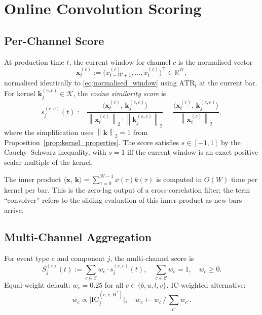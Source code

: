 \documentclass[11pt,a4paper]{article}
\theoremstyle{definition}
\theoremstyle{plain}
\newcommand{\R}{\mathbb{R}}
\newcommand{\bvec}[1]{\mathbf{#1}}
\newcommand{\norm}[1]{\left\lVert #1 \right\rVert}
\newcommand{\inner}[2]{\langle #1,\, #2 \rangle}
\begin{document}
\section{Online Convolution Scoring}
\label{sec:online}

\subsection{Per-Channel Score}

At production time $t$, the current window for channel $c$ is the normalised vector
\begin{equation}
    \bvec{x}^{(c)}_t :=
    \bigl(\tilde{x}^{(c)}_{t-W+1}, \ldots, \tilde{x}^{(c)}_t\bigr)^\top \in \R^W,
    \label{eq:live_window}
\end{equation}
normalised identically to \eqref{eq:normalised_window} using $\mathrm{ATR}_t$ at the
current bar. For kernel $\bvec{k}^{(e,c)}_j \in \mathcal{K}$, the \emph{cosine
similarity score} is
\begin{equation}
    s^{(e,c)}_j(t) :=
    \frac{\inner{\bvec{x}^{(c)}_t}{\bvec{k}^{(e,c)}_j}}
         {\norm{\bvec{x}^{(c)}_t}_2 \cdot \norm{\bvec{k}^{(e,c)}_j}_2}
    = \frac{\inner{\bvec{x}^{(c)}_t}{\bvec{k}^{(e,c)}_j}}
           {\norm{\bvec{x}^{(c)}_t}_2},
    \label{eq:cosine_score}
\end{equation}
where the simplification uses $\norm{\bvec{k}}_2 = 1$ from
Proposition~\ref{prop:kernel_properties}. The score satisfies $s \in [-1, 1]$ by the
Cauchy--Schwarz inequality, with $s = 1$ iff the current window is an exact positive
scalar multiple of the kernel.

The inner product $\inner{\bvec{x}}{\bvec{k}} = \sum_{\tau=0}^{W-1} x(\tau) k(\tau)$
is computed in $O(W)$ time per kernel per bar. This is the zero-lag output of a
cross-correlation filter; the term ``convolver'' refers to the sliding evaluation of this
inner product as new bars arrive.

\subsection{Multi-Channel Aggregation}

For event type $e$ and component $j$, the multi-channel score is
\begin{equation}
    S^{(e)}_j(t) :=
    \sum_{c \in \mathcal{C}} w_c \cdot s^{(e,c)}_j(t),
    \quad \sum_{c \in \mathcal{C}} w_c = 1, \quad w_c \geq 0.
    \label{eq:multichannel_score}
\end{equation}
Equal-weight default: $w_c = 0.25$ for all $c \in \{b, u, l, v\}$. IC-weighted
alternative:
\begin{equation}
    w_c \propto \bigl|\mathrm{IC}^{(e,c,H^*)}_j\bigr|,
    \quad w_c \leftarrow w_c \,/\, \textstyle\sum_{c'} w_{c'}.
    \label{eq:ic_weights}
\end{equation}
\end{document}

